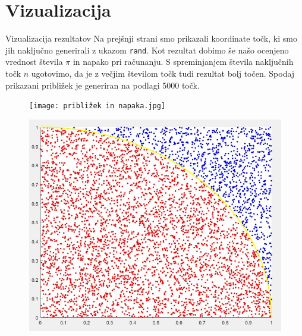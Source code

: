 \documentclass{beamer}
\begin{document}
\section{Vizualizacija}
\begin{frame}{Vizualizacija rezultatov}
    Na prejšnji strani smo prikazali koordinate točk, ki smo jih naključno generirali z ukazom \texttt{rand}. Kot rezultat dobimo še našo ocenjeno vrednost števila $\pi$ in napako pri računanju.  S spreminjanjem števila naključnih točk $n$ ugotovimo, da je z večjim številom točk tudi rezultat bolj točen. Spodaj prikazani približek je generiran na podlagi 5000 točk.  
\begin{figure}
  \begin{minipage}{0.5\textwidth}
    \centering
    \texttt{[image: približek in napaka.jpg]}
  \end{minipage}\hfill
  \pause
  \begin{minipage}{0.45\textwidth}
    \centering
    \includegraphics[width=\linewidth]{figure1.jpg}
  \end{minipage}
\end{figure}

\end{frame}
\end{document}
